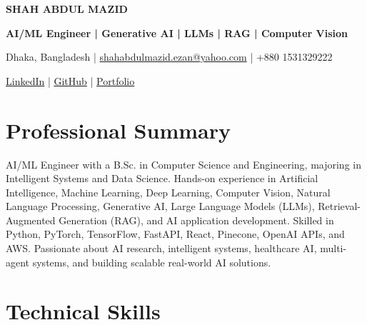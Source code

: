 ﻿\documentclass[10pt,a4paper]{article}
\begin{document}

\begin{center}

{\Huge\bfseries SHAH ABDUL MAZID}

\vspace{2mm}

{\large
\textbf{AI/ML Engineer | Generative AI | LLMs | RAG | Computer Vision}
}

\vspace{3mm}

Dhaka, Bangladesh
\quad | \quad
\href{mailto:shahabdulmazid.ezan@yahoo.com}{shahabdulmazid.ezan@yahoo.com}
\quad | \quad
+880 1531329222

\vspace{1.5mm}

\href{https://www.linkedin.com/in/shahabdulmazid}{LinkedIn}
\quad | \quad
\href{https://github.com/Shah-Abdul-Mazid}{GitHub}
\quad | \quad
\href{https://shah-abdul-mazid-portfolio.vercel.app/}{Portfolio}

\end{center}


\section{Professional Summary}

AI/ML Engineer with a B.Sc. in Computer Science and Engineering, majoring in Intelligent Systems and Data Science. Hands-on experience in Artificial Intelligence, Machine Learning, Deep Learning, Computer Vision, Natural Language Processing, Generative AI, Large Language Models (LLMs), Retrieval-Augmented Generation (RAG), and AI application development. Skilled in Python, PyTorch, TensorFlow, FastAPI, React, Pinecone, OpenAI APIs, and AWS. Passionate about AI research, intelligent systems, healthcare AI, multi-agent systems, and building scalable real-world AI solutions.


\section{Technical Skills}
\end{document}
